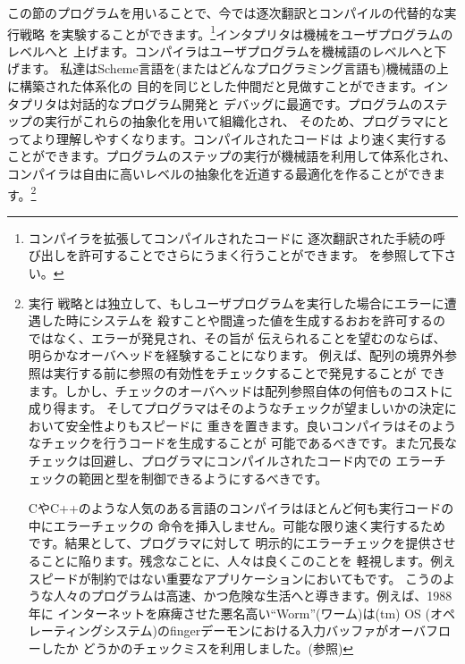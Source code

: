 この節のプログラムを用いることで、今では逐次翻訳とコンパイルの代替的な実行戦略
を実験することができます。\footnote{コンパイラを拡張してコンパイルされたコードに
逐次翻訳された手続の呼び出しを許可することでさらにうまく行うことができます。
を参照して下さい。}インタプリタは機械をユーザプログラムのレベルへと
上げます。コンパイラはユーザプログラムを機械語のレベルへと下げます。
私達はScheme言語を(またはどんなプログラミング言語も)機械語の上に構築された体系化の
目的を同じとした仲間だと見做すことができます。インタプリタは対話的なプログラム開発と
デバッグに最適です。プログラムのステップの実行がこれらの抽象化を用いて組織化され、
そのため、プログラマにとってより理解しやすくなります。コンパイルされたコードは
より速く実行することができます。プログラムのステップの実行が機械語を利用して体系化され、
コンパイラは自由に高いレベルの抽象化を近道する最適化を作ることができます。\footnote{
実行
戦略とは独立して、もしユーザプログラムを実行した場合にエラーに遭遇した時にシステムを
殺すことや間違った値を生成するおおを許可するのではなく、エラーが発見され、その旨が
伝えられることを望むのならば、明らかなオーバヘッドを経験することになります。
例えば、配列の境界外参照は実行する前に参照の有効性をチェックすることで発見することが
できます。しかし、チェックのオーバヘッドは配列参照自体の何倍ものコストに成り得ます。
そしてプログラマはそのようなチェックが望ましいかの決定において安全性よりもスピードに
重きを置きます。良いコンパイラはそのようなチェックを行うコードを生成することが
可能であるべきです。また冗長なチェックは回避し、プログラマにコンパイルされたコード内での
エラーチェックの範囲と型を制御できるようにするべきです。

CやC++のような人気のある言語のコンパイラはほとんど何も実行コードの中にエラーチェックの
命令を挿入しません。可能な限り速く実行するためです。結果として、プログラマに対して
明示的にエラーチェックを提供させることに陥ります。残念なことに、人々は良くこのことを
軽視します。例えスピードが制約ではない重要なアプリケーションにおいてもです。
こうのような人々のプログラムは高速、かつ危険な生活へと導きます。例えば、1988年に
インターネットを麻痺させた悪名高い``Worm''(ワーム)は(tm) OS
(オペレーティングシステム)のfingerデーモンにおける入力バッファがオーバフローしたか
どうかのチェックミスを利用しました。(参照)
}

